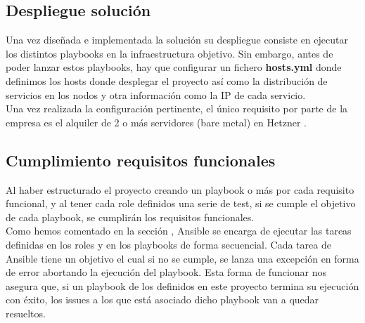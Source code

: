 \subsection{Despliegue solución}
\begin{text}
	Una vez diseñada e implementada la solución su despliegue consiste en ejecutar los distintos playbooks en la infraestructura objetivo. Sin embargo, antes de poder lanzar estos playbooks, hay que configurar un fichero \textbf{hosts.yml} donde definimos los hosts donde desplegar el proyecto así como la distribución de servicios en los nodos y otra información como la IP de cada servicio. \\
	Una vez realizada la configuración pertinente, el único requisito por parte de la empresa es el alquiler de 2 o más servidores (bare metal) en Hetzner \cite{hetzner:online}.
\end{text}

\subsection{Cumplimiento requisitos funcionales}
\begin{text}
	Al haber estructurado el proyecto creando un playbook o más por cada requisito funcional, y al tener cada role definidos una serie de test, si se cumple el objetivo de cada playbook, se cumplirán los requisitos funcionales. \\
	Como hemos comentado en la sección , Ansible se encarga de ejecutar las tareas definidas en los roles y en los playbooks de forma secuencial. Cada tarea de Ansible tiene un objetivo el cual si no se cumple, se lanza una excepción en forma de error abortando la ejecución del playbook. Esta forma de funcionar nos asegura que, si un playbook de los definidos en este proyecto termina su ejecución con éxito, los issues a los que está asociado dicho playbook van a quedar resueltos.
\end{text}


